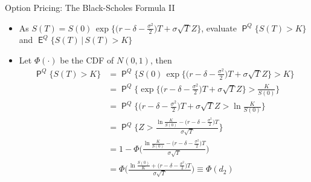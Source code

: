\documentclass[10pt,handout]{beamer}
\DeclareMathOperator\prb{\mathsf{P}}
\DeclareMathOperator\expc{\mathsf{E}}
\theoremstyle{definition}
\begin{document}
\begin{frame}{Option Pricing: The Black-Scholes Formula II}
  \begin{itemize} 
    \item As $S(T) = S(0)\,\exp\big\{\big(r - \delta - \frac{\sigma^2}{2}\big)T + \sigma\sqrt{T}Z\big\}$, evaluate $\prb^Q\{S(T) > K\}$ and $\expc^Q\{S(T)\,|\, S(T) > K\}$
    \item Let $\Phi(\cdot)$ be the CDF of $N(0, 1)$, then \vspace{-3mm}
      \begin{align*}
        \prb^Q\{S(T) > K\} &= \prb^Q\!\Big\{S(0)\,\exp\Big\{\Big(r - \delta - \frac{\sigma^2}{2}\Big)T + \sigma\sqrt{T}Z\Big\} > K\Big\} \\ 
        &=\prb^Q\!\Big\{\exp\Big\{\Big(r - \delta - \frac{\sigma^2}{2}\Big)T + \sigma\sqrt{T}Z\Big\} > \frac{K}{S(0)}\Big\} \\
        &=\prb^Q\!\Big\{\Big(r - \delta - \frac{\sigma^2}{2}\Big)T + \sigma\sqrt{T}Z > \ln\frac{K}{S(0)}\Big\} \\
        &=\prb^Q\!\bigg\{Z > \frac{\ln\frac{K}{S(0)} - \big(r - \delta - \frac{\sigma^2}{2}\big)T}{\sigma\sqrt{T}}\bigg\} \\
        &=1 - \Phi\bigg(\frac{\ln\frac{K}{S(0)} - \big(r - \delta - \frac{\sigma^2}{2}\big)T}{\sigma\sqrt{T}}\bigg) \\
        &=\Phi\bigg(\frac{\ln\frac{S(0)}{K} + \big(r - \delta - \frac{\sigma^2}{2}\big)T}{\sigma\sqrt{T}}\bigg) \equiv \Phi(d_2)
      \end{align*}
  \end{itemize}
\end{frame}
\end{document}
